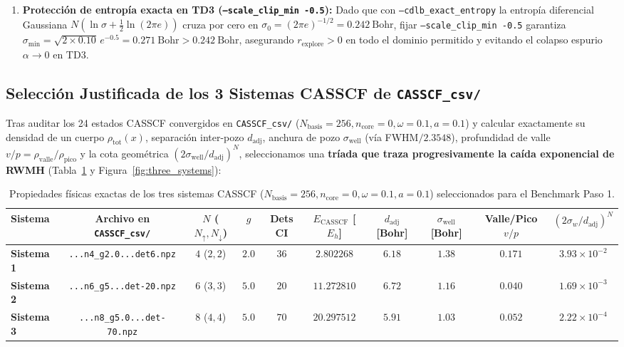 \documentclass[10pt,a4paper]{article}
\begin{document}
\begin{enumerate}
\item \textbf{Protección de entropía exacta en TD3 (\texttt{--scale\_clip\_min -0.5}):}
Dado que con \texttt{--cdlb\_exact\_entropy} la entropía diferencial Gaussiana $N(\ln\sigma + \frac{1}{2}\ln(2\pi e))$ cruza por cero en $\sigma_0 = (2\pi e)^{-1/2} = 0.242\ \mathrm{Bohr}$, fijar \texttt{--scale\_clip\_min -0.5} garantiza $\sigma_{\min} = \sqrt{2\times 0.10}\,e^{-0.5} = 0.271\ \mathrm{Bohr} > 0.242\ \mathrm{Bohr}$, asegurando $r_{\mathrm{explore}} > 0$ en todo el dominio permitido y evitando el colapso espurio $\alpha \to 0$ en TD3.
\end{enumerate}

\subsection{Selección Justificada de los 3 Sistemas CASSCF de \texttt{CASSCF\_csv/}}
\label{sec:systems}

Tras auditar los 24 estados CASSCF convergidos en \texttt{CASSCF\_csv/} ($N_{\mathrm{basis}}=256, n_{\mathrm{core}}=0, \omega=0.1, a=0.1$) y calcular exactamente su densidad de un cuerpo $\rho_{\mathrm{tot}}(x)$, separación inter-pozo $d_{\mathrm{adj}}$, anchura de pozo $\sigma_{\mathrm{well}}$ (vía FWHM$/2.3548$), profundidad de valle $v/p = \rho_{\mathrm{valle}}/\rho_{\mathrm{pico}}$ y la cota geométrica $(2\sigma_{\mathrm{well}}/d_{\mathrm{adj}})^N$, seleccionamos una \textbf{tríada que traza progresivamente la caída exponencial de RWMH} (Tabla~\ref{tab:systems} y Figura~\ref{fig:three_systems}):

\begin{table}[H]
\centering
\caption{Propiedades físicas exactas de los tres sistemas CASSCF ($N_{\mathrm{basis}}=256, n_{\mathrm{core}}=0, \omega=0.1, a=0.1$) seleccionados para el Benchmark Paso 1.}
\label{tab:systems}
\begin{adjustbox}{max width=\textwidth}
\begin{tabular}{lccccccccc}
\toprule
\textbf{Sistema} & \textbf{Archivo en \texttt{CASSCF\_csv/}} & $N$ ($N_\uparrow,N_\downarrow$) & $g$ & \textbf{Dets CI} & $E_{\mathrm{CASSCF}}$ [$E_h$] & $d_{\mathrm{adj}}$ [Bohr] & $\sigma_{\mathrm{well}}$ [Bohr] & \textbf{Valle/Pico $v/p$} & $(2\sigma_w/d_{\mathrm{adj}})^N$ \\
\midrule
\textbf{Sistema 1} & \texttt{...n4\_g2.0...det6.npz} & $4$ ($2,2$) & $2.0$ & $36$ & $2.802268$ & $6.18$ & $1.38$ & $0.171$ & $3.93\times 10^{-2}$ \\
\textbf{Sistema 2} & \texttt{...n6\_g5...det-20.npz} & $6$ ($3,3$) & $5.0$ & $20$ & $11.272810$ & $6.72$ & $1.16$ & $0.040$ & $1.69\times 10^{-3}$ \\
\textbf{Sistema 3} & \texttt{...n8\_g5.0...det-70.npz} & $8$ ($4,4$) & $5.0$ & $70$ & $20.297512$ & $5.91$ & $1.03$ & $0.052$ & $2.22\times 10^{-4}$ \\
\bottomrule
\end{tabular}
\end{adjustbox}
\end{table}
\end{document}
